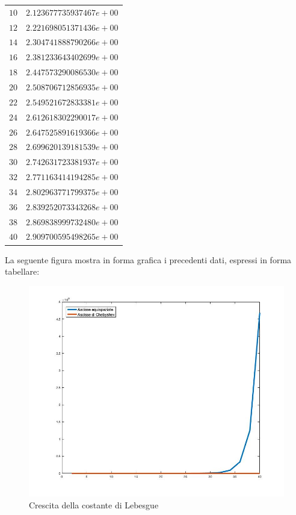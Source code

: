 \begin{table}[H]
\begin{minipage}{0.5\textwidth}
\begin{tabular}{|c|c|}
			$10$ & $2.123677735937467e+00$ \\ 
			$12$ & $2.221698051371436e+00$ \\ 
			$14$ & $2.304741888790266e+00$ \\ 
			$16$ & $2.381233643402699e+00$ \\ 
			$18$ & $2.447573290086530e+00$ \\ 
			$20$ & $2.508706712856935e+00$ \\ 
			$22$ & $2.549521672833381e+00$ \\ 
			$24$ & $2.612618302290017e+00$ \\ 
			$26$ & $2.647525891619366e+00$ \\ 
			$28$ & $2.699620139181539e+00$ \\ 
			$30$ & $2.742631723381937e+00$ \\ 
			$32$ & $2.771163414194285e+00$ \\ 
			$34$ & $2.802963771799375e+00$ \\ 
			$36$ & $2.839252073343268e+00$ \\ 
			$38$ & $2.869838999732480e+00$ \\ 
			$40$ & $2.909700595498265e+00$ \\ 
			\hline
		\end{tabular}
	\end{minipage}
\end{table}

La seguente figura mostra in forma grafica i precedenti dati, espressi in forma tabellare:
\begin{figure}[H]
	\includegraphics[width=\textwidth]{Chapter-4/Exercise-19/plot_lebesgue.jpg}
	\caption*{Crescita della costante di Lebesgue}
\end{figure}


